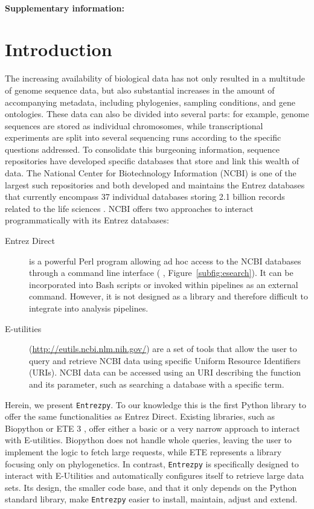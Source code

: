 \documentclass[a4paper]{article}
\newcommand{\entrezpy}{\texttt{Entrezpy}\xspace}
\begin{document}
  \paragraph{Supplementary information:}

\section{Introduction}
  The increasing availability of biological data has not only resulted in a
  multitude of genome sequence data, but also substantial increases in the
  amount of accompanying metadata, including phylogenies, sampling conditions,
  and gene ontologies. These data can also be divided into several parts: for
  example, genome sequences are stored as individual chromosomes, while
  transcriptional experiments are split into several sequencing runs according
  to the specific questions addressed. To consolidate this burgeoning
  information, sequence repositories have developed specific databases that
  store and link this wealth of data. The National Center for Biotechnology
  Information (NCBI) is one of the largest such repositories and both developed
  and maintains the Entrez databases that currently encompass 37 individual
  databases storing 2.1 billion records related to the life sciences
  \citep{NCBI2016}. NCBI offers two approaches to interact programmatically
  with its Entrez databases:

  \begin{description}
    \item[Entrez Direct] is a powerful Perl program allowing ad hoc access to
    the NCBI databases through a command line interface (\citep{Kans2018} ,
    Figure~\ref{subfig:esearch}). It can be incorporated into Bash scripts or
    invoked within pipelines  as an external command. However, it is not
    designed as a library and therefore difficult to integrate into analysis
    pipelines.

    \item[E-utilities] (\url{http://eutils.ncbi.nlm.nih.gov/}) are a set of
    tools that allow the user to query and retrieve NCBI data using specific
    Uniform Resource Identifiers (URIs). NCBI data can be accessed using an URI
    describing the function and its parameter, such as searching a database
    with a specific term.
  \end{description}


Herein, we present \entrezpy. To our knowledge this is the first Python library
to offer the same functionalities as Entrez Direct. Existing libraries, such as
Biopython \citep{Cock2009} or ETE 3 \citep{Huerta-Cepas2016}, offer either a
basic or a very narrow approach to interact with E-utilities. Biopython does
not handle whole queries, leaving the user to implement the logic to fetch
large requests, while ETE represents a library focusing only on phylogenetics.
In contrast, \entrezpy is specifically designed to interact with E-Utilities
and automatically configures itself to retrieve large data sets. Its design,
the smaller code base, and that it only depends on the Python standard library,
make \entrezpy easier to install, maintain, adjust and extend.
\end{document}

